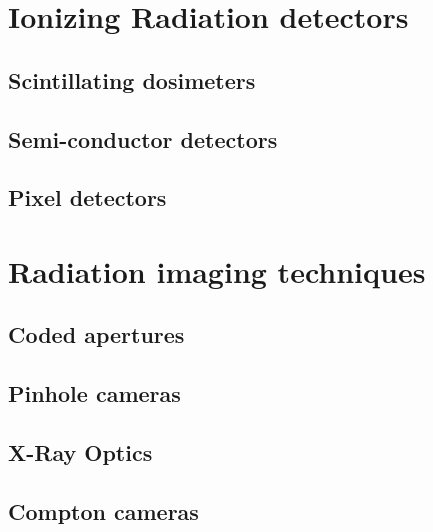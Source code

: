 \documentclass[a4paper,11pt,titlepage,twoside]{book}
\begin{document}
\section{Ionizing Radiation detectors}


\subsection{Scintillating dosimeters}

\subsection{Semi-conductor detectors}

\subsection{Pixel detectors}


\section{Radiation imaging techniques}


\subsection{Coded apertures}

\subsection{Pinhole cameras}

\subsection{X-Ray Optics}

\subsection{Compton cameras}



\clearpage

\end{document}
